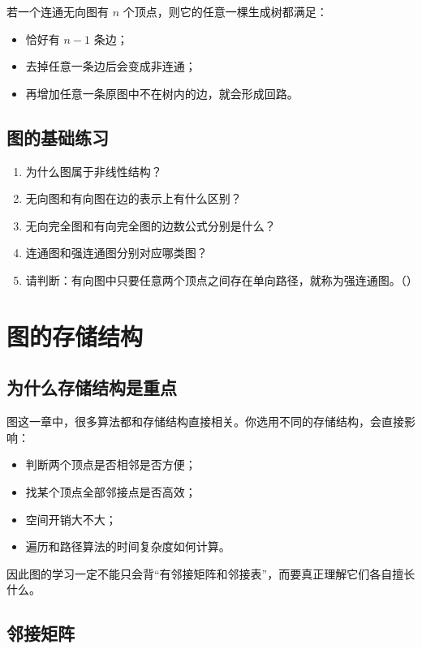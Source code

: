 \documentclass{../../note}
\begin{document}
若一个连通无向图有 $n$ 个顶点，则它的任意一棵生成树都满足：

\begin{itemize}
  \item 恰好有 $n-1$ 条边；
  \item 去掉任意一条边后会变成非连通；
  \item 再增加任意一条原图中不在树内的边，就会形成回路。
\end{itemize}

\subsection{图的基础练习}

\begin{enumerate}
  \item 为什么图属于非线性结构？
  \item 无向图和有向图在边的表示上有什么区别？
  \item 无向完全图和有向完全图的边数公式分别是什么？
  \item 连通图和强连通图分别对应哪类图？
  \item 请判断：有向图中只要任意两个顶点之间存在单向路径，就称为强连通图。（\hspace{1cm}）
\end{enumerate}

\section{图的存储结构}

\subsection{为什么存储结构是重点}

图这一章中，很多算法都和存储结构直接相关。你选用不同的存储结构，会直接影响：

\begin{itemize}
  \item 判断两个顶点是否相邻是否方便；
  \item 找某个顶点全部邻接点是否高效；
  \item 空间开销大不大；
  \item 遍历和路径算法的时间复杂度如何计算。
\end{itemize}

因此图的学习一定不能只会背“有邻接矩阵和邻接表”，而要真正理解它们各自擅长什么。

\subsection{邻接矩阵}
\end{document}

